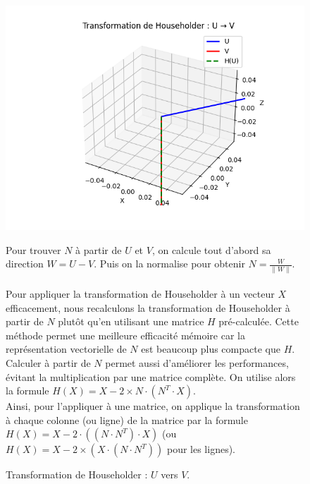 \documentclass{article}
\begin{document}
\begin{figure}[H]
\centering
\begin{minipage}{0.35\textwidth}
\includegraphics[width=\textwidth, trim=3cm 0 2.5cm 0, clip]{householder_transformation.png}
\caption{Transformation de Householder : $U$ vers $V$.}%
\label{fig:householder}
\end{minipage}
\hfill
\begin{minipage}{0.62\textwidth}
Pour trouver $N$ à partir de $U$ et $V$, on calcule tout d'abord sa direction $W = U - V$. Puis on la normalise pour obtenir $N = \frac{W}{\|W\|}$.\\ \\
Pour appliquer la transformation de Householder à un vecteur $X$ efficacement, nous recalculons la transformation de Householder à partir de $N$ plutôt qu'en utilisant une matrice $H$ pré-calculée. Cette méthode permet une meilleure efficacité mémoire car la représentation vectorielle de $N$ est beaucoup plus compacte que $H$. \\
Calculer à partir de $N$ permet aussi d'améliorer les performances, évitant la multiplication par une matrice complète. On utilise alors la formule $H(X) = X - 2 \times N \cdot (N^T \cdot X)$. \\
Ainsi, pour l'appliquer à une matrice, on applique la transformation à chaque colonne (ou ligne) de la matrice par la formule $H(X) = X - 2 \cdot ((N \cdot N^T) \cdot X)$  (ou $H(X) = X - 2 \times (X \cdot (N \cdot N^T))$ pour les lignes).

\end{minipage}
\end{figure}
\end{document}

